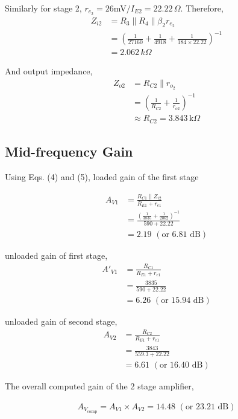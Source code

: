 Similarly for stage 2, $r_{e_2}=26$mV$/I_{E2}=22.22\,\Omega$. Therefore,
\begin{align*}
    Z_{i2} &= R_3 \parallel R_4 \parallel \beta_2 r_{e_2}\\
    &= \left( \frac{1}{27160} + \frac{1}{4918} + \frac{1}{184 \times 22.22} \right)^{-1}\\
    &= 2.062\,k\Omega
\end{align*}

And output impedance,
\begin{align*}
    Z_{o2} &= R_{C2} \parallel r_{o_2} \\
    &= \left( \frac{1}{R_{C2}}+\frac{1}{r_{o2}}\right)^{-1} \\
    &\approx R_{C2}=3.843\,\text{k}\Omega
\end{align*}

\subsection*{Mid-frequency Gain}

Using Eqs. (4) and (5), loaded gain of the first stage

\begin{align*}
    A_{V1} &= \frac{R_{C1} \parallel Z_{i2}}{R_{E1} + r_{e1}}\\
    &=\frac{\left( \frac{1}{3835} + \frac{1}{2062}\right)^{-1}}{590+22.22}\\
    &= 2.19\,\,(\text{or 6.81 dB})
\end{align*}

unloaded gain of first stage,
\begin{align*}
    A'_{V1} &= \frac{R_{C1}}{R_{E1} + r_{e1}}\\
    &=\frac{3835}{590+22.22}\\
    &= 6.26\,\,(\text{or 15.94 dB})
\end{align*}

unloaded gain of second stage,
\begin{align*}
    A_{V2} &= \frac{R_{C2}}{R_{E1} + r_{e1}}\\
    &=\frac{3843}{559.3+22.22}\\
    &= 6.61\,\,(\text{or 16.40 dB})
\end{align*}

The overall computed gain of the 2 stage amplifier,

\begin{align*}
    A_{V_\text{comp}}=A_{V1}\times A_{V2} = 14.48\,\,(\text{or 23.21 dB})
\end{align*}

